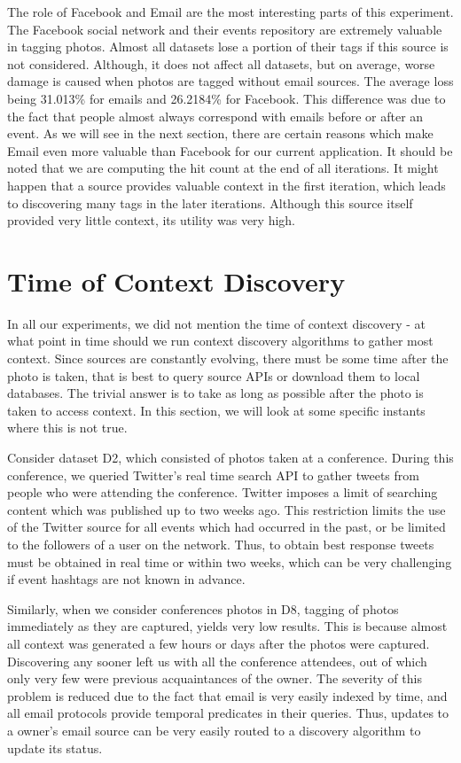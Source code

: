 The role of Facebook and Email are the most interesting parts of this experiment. The Facebook social network and their events repository are extremely valuable in tagging photos. Almost all datasets lose a portion of their tags if this source is not considered. Although, it does not affect all datasets, but on average, worse damage is caused when photos are tagged without email sources. The average loss being 31.013\% for emails and 26.2184\% for Facebook. This difference was due to the fact that people almost always correspond with emails before or after an event. As we will see in the next section, there are certain reasons which make Email even more valuable than Facebook for our current application. It should be noted that we are computing the hit count at the end of all iterations. It might happen that a source provides valuable context in the first iteration, which leads to discovering many tags in the later iterations. Although this source itself provided very little context, its utility was very high.

\section{Time of Context Discovery}

In all our experiments, we did not mention the time of context discovery - at what point in time should we run context discovery algorithms to gather most context. Since sources are constantly evolving, there must be some time after the photo is taken, that is best to query source APIs or download them to local databases. The trivial answer is to take as long as possible after the photo is taken to access context. In this section, we will look at some specific instants where this is not true.

Consider dataset D2, which consisted of photos taken at a conference. During this conference, we queried Twitter's real time search API to gather tweets from people who were attending the conference. Twitter imposes a limit of searching content which was published up to two weeks ago. This restriction limits the use of the Twitter source for all events which had occurred in the past, or be limited to the followers of a user on the network. Thus, to obtain best response tweets must be obtained in real time or within two weeks, which can be very challenging if event hashtags are not known in advance.

Similarly, when we consider conferences photos in D8, tagging of photos immediately as they are captured, yields very low results. This is because almost all context was generated a few hours or days after the photos were captured. Discovering any sooner left us with all the conference attendees, out of which only very few were previous acquaintances of the owner. The severity of this problem is reduced due to the fact that email is very easily indexed by time, and all email protocols provide temporal predicates in their queries. Thus, updates to a owner's email source can be very easily routed to a discovery algorithm to update its status.

